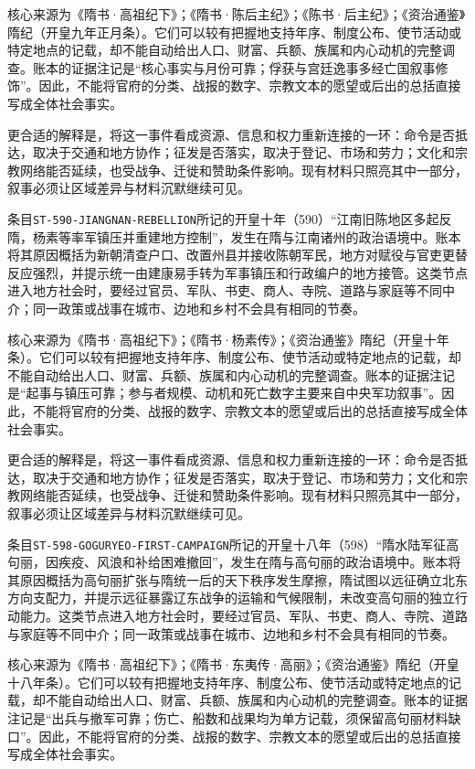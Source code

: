 核心来源为《隋书·高祖纪下》；《隋书·陈后主纪》；《陈书·后主纪》；《资治通鉴》隋纪（开皇九年正月条）。它们可以较有把握地支持年序、制度公布、使节活动或特定地点的记载，却不能自动给出人口、财富、兵额、族属和内心动机的完整调查。账本的证据注记是“核心事实与月份可靠；俘获与宫廷逸事多经亡国叙事修饰”。因此，不能将官府的分类、战报的数字、宗教文本的愿望或后出的总括直接写成全体社会事实。

更合适的解释是，将这一事件看成资源、信息和权力重新连接的一环：命令是否抵达，取决于交通和地方协作；征发是否落实，取决于登记、市场和劳力；文化和宗教网络能否延续，也受战争、迁徙和赞助条件影响。现有材料只照亮其中一部分，叙事必须让区域差异与材料沉默继续可见。

条目\texttt{ST-590-JIANGNAN-REBELLION}所记的开皇十年（590）“江南旧陈地区多起反隋，杨素等率军镇压并重建地方控制”，发生在隋与江南诸州的政治语境中。账本将其原因概括为新朝清查户口、改置州县并接收陈朝军民，地方对赋役与官吏更替反应强烈，并提示统一由建康易手转为军事镇压和行政编户的地方接管。这类节点进入地方社会时，要经过官员、军队、书吏、商人、寺院、道路与家庭等不同中介；同一政策或战事在城市、边地和乡村不会具有相同的节奏。

核心来源为《隋书·高祖纪下》；《隋书·杨素传》；《资治通鉴》隋纪（开皇十年条）。它们可以较有把握地支持年序、制度公布、使节活动或特定地点的记载，却不能自动给出人口、财富、兵额、族属和内心动机的完整调查。账本的证据注记是“起事与镇压可靠；参与者规模、动机和死亡数字主要来自中央军功叙事”。因此，不能将官府的分类、战报的数字、宗教文本的愿望或后出的总括直接写成全体社会事实。

更合适的解释是，将这一事件看成资源、信息和权力重新连接的一环：命令是否抵达，取决于交通和地方协作；征发是否落实，取决于登记、市场和劳力；文化和宗教网络能否延续，也受战争、迁徙和赞助条件影响。现有材料只照亮其中一部分，叙事必须让区域差异与材料沉默继续可见。

条目\texttt{ST-598-GOGURYEO-FIRST-CAMPAIGN}所记的开皇十八年（598）“隋水陆军征高句丽，因疾疫、风浪和补给困难撤回”，发生在隋与高句丽的政治语境中。账本将其原因概括为高句丽扩张与隋统一后的天下秩序发生摩擦，隋试图以远征确立北东方向支配力，并提示远征暴露辽东战争的运输和气候限制，未改变高句丽的独立行动能力。这类节点进入地方社会时，要经过官员、军队、书吏、商人、寺院、道路与家庭等不同中介；同一政策或战事在城市、边地和乡村不会具有相同的节奏。

核心来源为《隋书·高祖纪下》；《隋书·东夷传·高丽》；《资治通鉴》隋纪（开皇十八年条）。它们可以较有把握地支持年序、制度公布、使节活动或特定地点的记载，却不能自动给出人口、财富、兵额、族属和内心动机的完整调查。账本的证据注记是“出兵与撤军可靠；伤亡、船数和战果均为单方记载，须保留高句丽材料缺口”。因此，不能将官府的分类、战报的数字、宗教文本的愿望或后出的总括直接写成全体社会事实。

